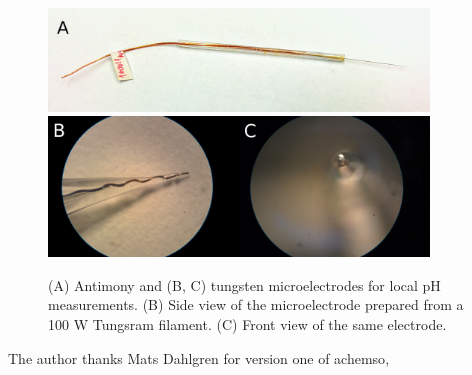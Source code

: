 \documentclass[manuscript=article, journal=jceda8]{achemso}
\begin{document}
\begin{figure}
\centering
\includegraphics[width=0.9\textwidth]{img/sb_top.jpg}
\includegraphics[width=0.45\textwidth]{img/wolfram_electrode1.jpg}\includegraphics[width=0.45\textwidth]{img/wolfram_electrode2.jpg}

\caption[Antimony and tungsten microelectrodes for local pH measurements.]{(A) Antimony and (B, C) tungsten microelectrodes for local pH measurements.
(B) Side view of the microelectrode prepared from a 100 W Tungsram filament.
(C) Front view of the same electrode.}
\label{fig:tungsten_electrode}
\end{figure}

		
\begin{acknowledgement}
The author thanks Mats Dahlgren for version one of \textsf{achemso},
\end{acknowledgement}


\end{document}
